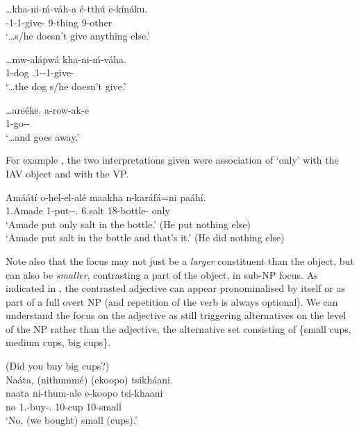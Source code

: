 \documentclass[output=paper]{langscibook}
\begin{document}
\sn
{\gll
  …kha-ni-ḿ-váh-a  é-tthú  e-kínáku.   \\
\NEG{}-1\SM{}-1\OM{}-give-\FV{}  9-thing  9-other \\
}\jambox*{[Theme]}
\glt ‘…s/he doesn’t give anything else.’


\sn
{\gll
  …mw-alápwá  kha-ni-ḿ-váha.   \\
1-dog  \NEG{}.1\SM{}-\PRS{}-1\OM{}-give-\FV{} \\
}\jambox*{[Recipient]}
\glt ‘…the dog s/he doesn’t give.’


\sn
  …areéke.  \jambox*{[VP]}
\gll
a-row-ak-e\\
1\SM{}-go-\DUR{}-\SBJV{}\\
\glt ‘…and goes away.’

\z

For example , the two interpretations given were association of ‘only’ with the IAV object and with the VP.

\ea
\label{bkm:Ref115119526}
\gll
Amáátí  o-hel-el-alé  maakha  n-karáfá=ni  paáhí.\\
1.Amade  1\SM{}-put-\APPL{}-\PFV{}.\CJ{}  6.salt  18-bottle-\LOC{}  only\\
\glt
‘Amade put only salt in the bottle.’ (He put nothing else)\\
‘Amade put salt in the bottle and that’s it.’ (He did nothing else)

\z


Note also that the focus may not just be a \textit{larger} constituent than the object, but can also be \textit{smaller}, contrasting a part of the object, in sub-NP focus. As indicated in , the contrasted adjective can appear pronominalised by itself or as part of a full overt NP (and repetition of the verb is always optional). We can understand the focus on the adjective as still triggering alternatives on the level of the NP rather than the adjective, the alternative set consisting of \{small cups, medium cups, big cups\}.

\ea
\label{bkm:Ref114753582}
(Did you buy big cups?)\\
Naáta, (nithummé) (ekoopo) tsikháani.\\
\gll
naata  ni-thum-ale  e-koopo  tsi-khaani\\
no  1\PL{}.\SM{}-buy-\PFV{}.\CJ{}  10-cup  10-small\\
\glt
‘No, (we bought) small (cups).’\\
\end{document}
